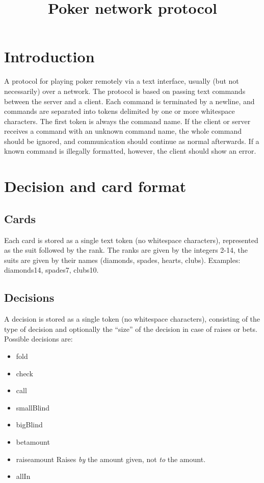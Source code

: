 \documentclass{article}
\title{Poker network protocol}
\begin{document}
\maketitle

\section{Introduction}
A protocol for playing poker remotely via a text interface, usually (but not necessarily) over a network. The protocol is based on passing text commands between the server and a client. Each command is terminated by a newline, and commands are separated into tokens delimited by one or more whitespace characters. The first token is always the command name. If the client or server receives a command with an unknown command name, the whole command should be ignored, and communication should continue as normal afterwards. If a known command is illegally formatted, however, the client should show an error.

\section{Decision and card format}
\subsection*{Cards}
Each card is stored as a single text token (no whitespace characters), represented as the suit followed by the rank. The ranks are given by the integers 2-14, the suits are given by their names (diamonds, spades, hearts, clubs). Examples: diamonds14, spades7, clubs10.

\subsection*{Decisions}
A decision is stored as a single token (no whitespace characters), consisting of the type of decision and optionally the ``size'' of the decision in case of raises or bets. Possible decisions are:

\begin{itemize}
\item fold
\item check
\item call
\item smallBlind
\item bigBlind
\item bet\textlangle{}amount\textrangle{} 
\item raise\textlangle{}amount\textrangle{} Raises \textit{by} the amount given, not \textit{to} the amount.
\item allIn
\end{itemize}
\end{document}
